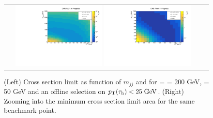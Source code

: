 \begin{figure}[tbh!]
	\centering
	\begin{tabular}{cc}
		\includegraphics[width=0.45\textwidth]{analysis/pics/JetInvMass_vs_MET_xsec_chi200_lsp050_taupt25.pdf}
		\includegraphics[width=0.45\textwidth]{analysis/pics/JetInvMass_vs_MET_xsec_chi200_lsp050_taupt25_zoom.pdf}
	\end{tabular}
	\caption{(Left) Cross section limit as function of $m_{jj}$ and \met for \charginopm = \neutralinotwo = 200 GeV, \neutralinoone = 50 GeV and an offline selection on $p_{\text{T}}(\tau_{\text{h}}) <  25\;\text{Ge}\kern-0.06667em\text{V}$. (Right) Zooming into the minimum cross section limit area for the same benchmark point.}
	\label{fig::JetInvMass_vs_MET_xsec_chi200_lsp050_taupt25}
\end{figure}

